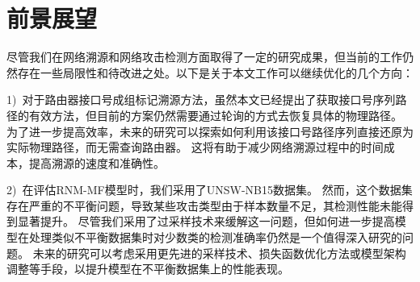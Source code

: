 \section{前景展望}
尽管我们在网络溯源和网络攻击检测方面取得了一定的研究成果，但当前的工作仍然存在一些局限性和待改进之处。以下是关于本文工作可以继续优化的几个方向：\par

1)~对于路由器接口号成组标记溯源方法，虽然本文已经提出了获取接口号序列路径的有效方法，但目前的方案仍然需要通过轮询的方式去恢复具体的物理路径。
为了进一步提高效率，未来的研究可以探索如何利用该接口号路径序列直接还原为实际物理路径，而无需查询路由器。
这将有助于减少网络溯源过程中的时间成本，提高溯源的速度和准确性。\par

2)~在评估RNM-MF模型时，我们采用了UNSW-NB15数据集。
然而，这个数据集存在严重的不平衡问题，导致某些攻击类型由于样本数量不足，其检测性能未能得到显著提升。
尽管我们采用了过采样技术来缓解这一问题，但如何进一步提高模型在处理类似不平衡数据集时对少数类的检测准确率仍然是一个值得深入研究的问题。
未来的研究可以考虑采用更先进的采样技术、损失函数优化方法或模型架构调整等手段，以提升模型在不平衡数据集上的性能表现。\par